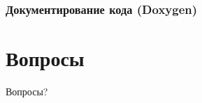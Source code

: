\documentclass{beamer}
\begin{document}
\begin{frame}
\frametitle{Документирование кода (Doxygen)}



\end{frame}

\section{Вопросы}

\begin{frame}
\Huge{\centerline{Вопросы?}}
\end{frame}

\end{document}
